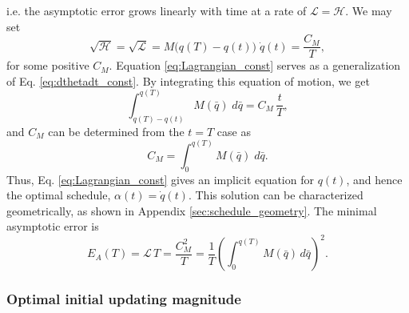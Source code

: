 \documentclass[preprint, superscriptaddress, floatfix]{revtex4-1}
\newcommand{\Err}{E}
\begin{document}
i.e. the asymptotic error grows
linearly with time at a rate of
$\mathcal L = \mathcal H$.
%
We may set
%
\begin{equation}
  \sqrt{ \mathcal H }
  =
  \sqrt{ \mathcal L }
  =
  M\bigl( q(T) - q(t) \bigr)
  \;
  \dot q(t)
  =
  \frac{C_M}{T}
  ,
  \label{eq:Lagrangian_const}
\end{equation}
%
for some positive $C_M$.
%
Equation \eqref{eq:Lagrangian_const} serves
as a generalization of Eq. \eqref{eq:dthetadt_const}.
%
By integrating this equation of motion, we get
%
\begin{equation}
  \int_{ q(T) - q(t) }^{ q(T) }
    M(\bar q)
    \;
    d \bar q
  =
  C_M \, \frac t T
  ,
  \label{eq:q_opt}
\end{equation}
%
and $C_M$ can be determined from
the $t = T$ case as
%
\begin{equation}
  C_M =
  \int_{ 0 }^{ q(T) }
    M( \bar q )
    \;
    d \bar q
  .
  \label{eq:mint}
\end{equation}
%
Thus, Eq. \eqref{eq:Lagrangian_const}
gives an implicit equation for $q(t)$,
and hence the optimal schedule,
$\alpha(t) = \dot q(t)$.
%
This solution can be characterized geometrically,
as shown in Appendix \ref{sec:schedule_geometry}.
%
The minimal asymptotic error is
%
\begin{equation}
  \Err_A(T)
  =
  \mathcal L \, T
  =
  \frac { C_M^2 } { T }
  =
  \frac 1 T
  \left(
    \int_0^{ q(T) } M(\bar q) \, d \bar q
  \right)^{\!\!2}
  .
\label{eq:error_asym2}
\end{equation}






\subsubsection{\label{sec:optinitalpha}
  Optimal initial updating magnitude
}
\end{document}
